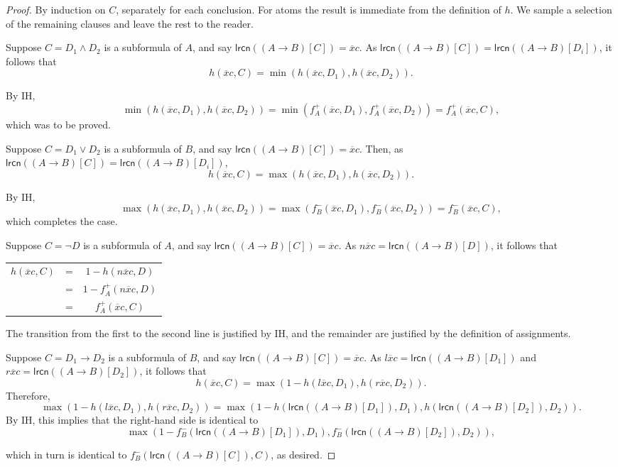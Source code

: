 \documentclass[10pt,a4paper]{amsart}
\newcommand{\lrcn}{\mathsf{lrcn}}
\begin{document}
\begin{proof}
    By induction on $C$, separately for each conclusion. For atoms the result is immediate from the definition of $h$. We sample a selection of the remaining clauses and leave the rest to the reader.

    Suppose $C=D_1\land D_2$ is a subformula of $A$, and say $\lrcn((A\to B)[C])=\overline{x}c$. As $\lrcn((A\to B)[C])=\lrcn((A\to B)[D_i])$,
    it follows that
    \[
    h(\overline{x}c,C)=\min(h(\overline{x}c,D_1), h(\overline{x}c,D_2)).
    \]
    
     By IH, 
    \[
    \min(h(\overline{x}c,D_1), h(\overline{x}c,D_2))=\min(f^+_A(\overline{x}c,D_1),f^+_A(\overline{x}c,D_2))=f^+_A(\overline{x}c,C),
    \]
    which was to be proved.

    Suppose $C=D_1\lor D_2$ is a subformula of $B$, and say $\lrcn((A\to B)[C])=\overline{x}c$. Then, as $\lrcn((A\to B)[C])=\lrcn((A\to B)[D_i])$,
    \[
    h(\overline{x}c,C)=\max(h(\overline{x}c,D_1), h(\overline{x}c,D_2)). 
    \]
    
    By IH,
    \[
    \max(h(\overline{x}c,D_1), h(\overline{x}c,D_2))=\max(f^-_B(\overline{x}c,D_1),f^-_B(\overline{x}c,D_2))=f^-_B(\overline{x}c,C),
    \]
    which completes the case.

    Suppose $C=\neg D$ is a subformula of $A$, and say $\lrcn((A\to B)[C])=\overline{x}c$. As $n\overline{x}c=\lrcn((A\to B)[D])$, it follows that
    \begin{center}
    \begin{tabular}{ccc}
    $h(\overline{x}c,C)$ & = &  $1-h(n\overline{x}c,D)$\\ 
    & =& $1-f^+_A(n\overline{x}c,D)$ \\ 
    & =& $f^+_A(\overline{x}c,C)$ \\ 
    \end{tabular}
    \end{center}
    The transition from the first to the second line is justified by IH, and the remainder are justified by the definition of assignments. 
    
    Suppose $C=D_1\to D_2$ is a subformula of $B$, and say $\lrcn((A\to B)[C])=\overline{x}c$. 
    As $l\overline{x}c=\lrcn((A\to B)[D_1])$ and $r\overline{x}c=\lrcn((A\to B)[D_2])$, it follows that 
    \[
    h(\overline{x}c,C)=\max(1-h(l\overline{x}c,D_1), h(r\overline{x}c,D_2)).
    \]
    Therefore, 
    \[
    \max(1-h(l\overline{x}c,D_1), h(r\overline{x}c,D_2))=\max(1-h(\lrcn((A\to B)[D_1]),D_1), h(\lrcn((A\to B)[D_2]),D_2)).
    \]
    By IH, this implies that the right-hand side is identical to
    \[
    \max(1-f^-_B(\lrcn((A\to B)[D_1]),D_1), f^-_B(\lrcn((A\to B)[D_2]),D_2)), 
    \]
    
    which in turn is identical to $f^-_B(\lrcn((A\to B)[C]),C)$,
    as desired.

\end{proof}
\end{document}
